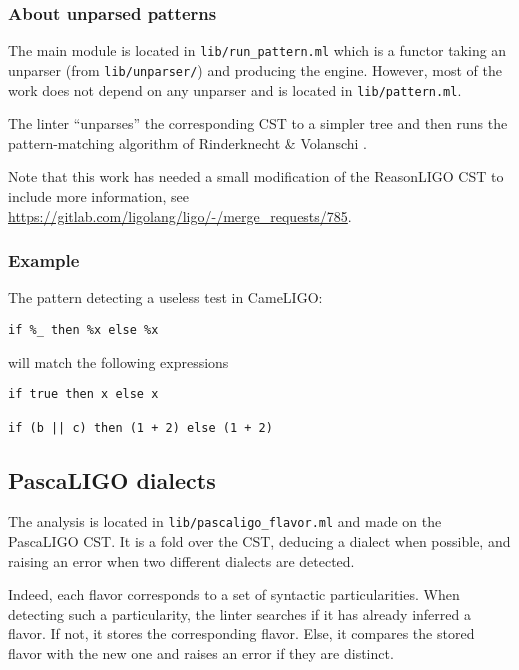 \documentclass[10pt,a4paper]{article}
\begin{document}
\subsubsection{About unparsed patterns}

The main module is located in \verb|lib/run_pattern.ml| which is a
functor taking an unparser (from \verb|lib/unparser/|) and producing
the engine. However, most of the work does not depend on any unparser
and is located in \verb|lib/pattern.ml|.

The linter ``unparses'' the corresponding CST to a simpler tree and
then runs the pattern-matching algorithm of Rinderknecht \& Volanschi
\cite{unparsedpatterns}.

Note that this work has needed a small modification of the ReasonLIGO
CST to include more information, see
\url{https://gitlab.com/ligolang/ligo/-/merge_requests/785}.

\subsubsection{Example}
The pattern detecting a useless test in CameLIGO:
\begin{verbatim}
if %_ then %x else %x
\end{verbatim}

will match the following expressions
\begin{verbatim}
if true then x else x

if (b || c) then (1 + 2) else (1 + 2)
\end{verbatim}


\subsection{PascaLIGO dialects}
The analysis is located in \verb|lib/pascaligo_flavor.ml| and made on
the PascaLIGO CST. It is a fold over the CST, deducing a dialect when
possible, and raising an error when two different dialects are
detected.

Indeed, each flavor corresponds to a set of syntactic particularities.
When detecting such a particularity, the linter searches if it has already
inferred a flavor. If not, it stores the corresponding flavor. Else, it
compares the stored flavor with the new one and raises an error if they
are distinct.
\end{document}
